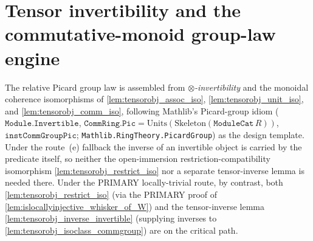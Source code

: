 \section{Tensor invertibility and the commutative-monoid group-law engine}
\label{sec:tensorobj_invertibility}

The relative Picard group law is assembled from \emph{\(\otimes\)-invertibility}
and the monoidal coherence isomorphisms of
\cref{lem:tensorobj_assoc_iso}, \cref{lem:tensorobj_unit_iso}, and
\cref{lem:tensorobj_comm_iso},
following Mathlib's Picard-group idiom (\(\mathtt{Module.Invertible}\),
\(\mathtt{CommRing.Pic} = \mathrm{Units}(\mathrm{Skeleton}(\mathtt{ModuleCat}\,R))\),
\(\mathtt{instCommGroupPic}\); \texttt{Mathlib.RingTheory.PicardGroup}) as the
design template. Under the route~(e) fallback the inverse of an invertible object
is carried by the predicate itself, so neither the open-immersion
restriction-compatibility isomorphism \cref{lem:tensorobj_restrict_iso} nor a
separate tensor-inverse lemma is needed there. Under the PRIMARY locally-trivial
route, by contrast, both \cref{lem:tensorobj_restrict_iso} (via the PRIMARY proof
of \cref{lem:islocallyinjective_whisker_of_W}) and the tensor-inverse lemma
\cref{lem:tensorobj_inverse_invertible} (supplying inverses to
\cref{lem:tensorobj_isoclass_commgroup}) are on the critical path.

